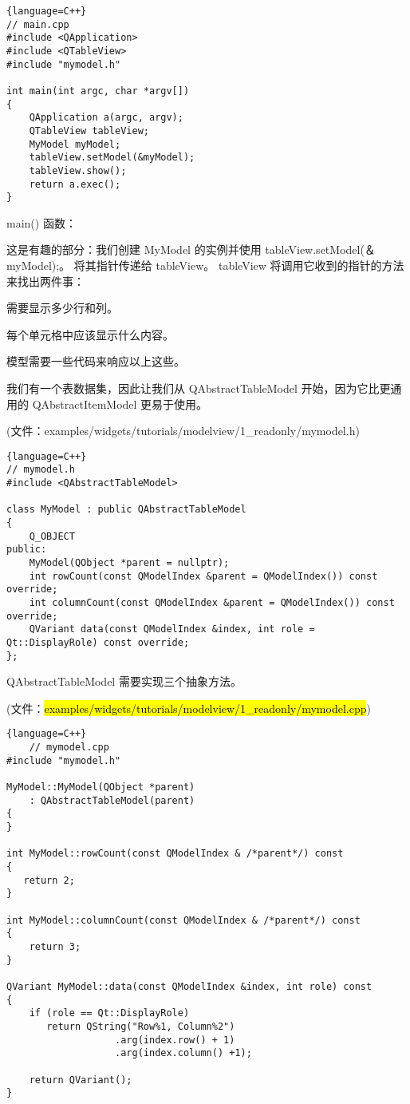 \begin{lstlisting}{language=C++}
// main.cpp
#include <QApplication>
#include <QTableView>
#include "mymodel.h"
	
int main(int argc, char *argv[])
{
	QApplication a(argc, argv);
	QTableView tableView;
	MyModel myModel;
	tableView.setModel(&myModel);
	tableView.show();
	return a.exec();
}
\end{lstlisting}

main() 函数：

这是有趣的部分：我们创建 MyModel 的实例并使用 tableView.setModel(＆myModel);。 
将其指针传递给 tableView。 tableView 将调用它收到的指针的方法来找出两件事：

\begin{compactitem}
\item 需要显示多少行和列。
\item 每个单元格中应该显示什么内容。
\end{compactitem}

模型需要一些代码来响应以上这些。

我们有一个表数据集，因此让我们从 QAbstractTableModel 开始，因为它比更通用的 QAbstractItemModel 更易于使用。

(文件：examples/widgets/tutorials/modelview/1\_readonly/mymodel.h)

\begin{lstlisting}{language=C++}
// mymodel.h
#include <QAbstractTableModel>
	
class MyModel : public QAbstractTableModel
{
	Q_OBJECT
public:
	MyModel(QObject *parent = nullptr);
	int rowCount(const QModelIndex &parent = QModelIndex()) const override;
	int columnCount(const QModelIndex &parent = QModelIndex()) const override;
	QVariant data(const QModelIndex &index, int role = Qt::DisplayRole) const override;
};
\end{lstlisting}

QAbstractTableModel 需要实现三个抽象方法。

(文件：\hl{examples/widgets/tutorials/modelview/1\_readonly/mymodel.cpp})

\begin{lstlisting}{language=C++}
	// mymodel.cpp
#include "mymodel.h"

MyModel::MyModel(QObject *parent)
    : QAbstractTableModel(parent)
{
}

int MyModel::rowCount(const QModelIndex & /*parent*/) const
{
   return 2;
}

int MyModel::columnCount(const QModelIndex & /*parent*/) const
{
    return 3;
}

QVariant MyModel::data(const QModelIndex &index, int role) const
{
    if (role == Qt::DisplayRole)
       return QString("Row%1, Column%2")
                   .arg(index.row() + 1)
                   .arg(index.column() +1);

    return QVariant();
}
\end{lstlisting}


